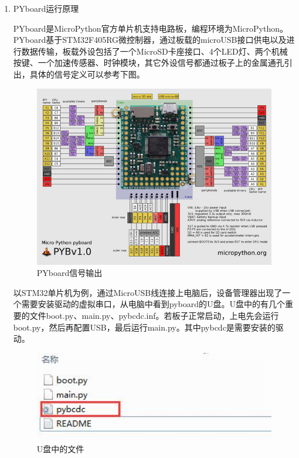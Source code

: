 \begin{enumerate}[(1)]
\item PYboard运行原理

      PYboard是MicroPython官方单片机支持电路板，编程环境为MicroPython。PYboard基于STM32F405RG微控制器，通过板载的microUSB接口供电以及进行数据传输，板载外设包括了一个MicroSD卡座接口、4个LED灯、两个机械按键、一个加速传感器、时钟模块，其它外设信号都通过板子上的金属通孔引出，具体的信号定义可以参考下图。

      \begin{figure}[H]
      \centering
      \includegraphics[width=12cm]{3_pyboard.jpg}
      \caption{PYboard信号输出}
      \label{PYboard信号输出}
      \end{figure}

      以STM32单片机为例，通过MicroUSB线连接上电脑后，设备管理器出现了一个需要安装驱动的虚拟串口，从电脑中看到pyboard的U盘。U盘中的有几个重要的文件boot.py、main.py、pybcdc.inf。若板子正常启动，上电先会运行boot.py，然后再配置USB，最后运行main.py。其中pybcdc是需要安装的驱动。

      \begin{figure}[H]
      \centering
      \includegraphics[width=12cm]{3_upan.jpg}
      \caption{U盘中的文件}
      \label{U盘中的文件}
      \end{figure}


\end{enumerate}
